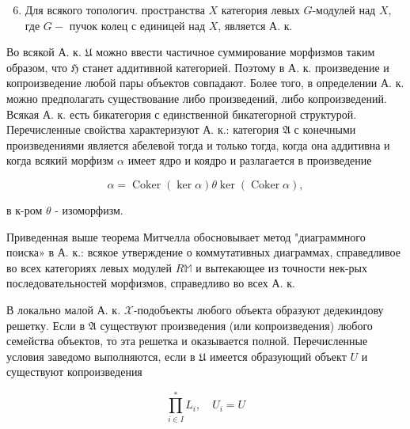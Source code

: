 \documentclass[10pt]{article}
\begin{document}
\begin{enumerate}

  \setcounter{enumi}{5}

  \item Для всякого топологич. пространства $X$ категория левых $G$-модулей над $X$, где $G-$ пучок колец с единицей над $X$, является А. к.

\end{enumerate}



Во всякой А. к. $\mathfrak{U}$ можно ввести частичное суммирование морфизмов таким образом, что $\mathfrak{H}$ станет аддитивной категорией. Поэтому в А. к. произведение и копроизведение любой пары объектов совпадают. Более того, в определении А. к. можно предполагать существование либо произведений, либо копроизведений. Всякая А. к. есть бикатегория с единственной бикатегорной структурой. Перечисленные свойства характеризуют А. к.: категория $\mathfrak{A}$ с конечными произведениями является абелевой тогда и только тогда, когда она аддитивна и когда всякий морфизм $\alpha$ имеет ядро и коядро и разлагается в произведение



\[

\alpha=\operatorname{Coker}(\operatorname{ker} \alpha) \theta \operatorname{ker}(\operatorname{Coker} \alpha),

\]



в к-ром $\theta$ - изоморфизм.



Приведенная выше теорема Митчелла обосновывает метод "диаграммного поиска» в А. к.: всякое утверждение о коммутативных диаграммах, справедливое во всех категориях левых модулей $R \mathbb{M}$ и вытекающее из точности нек-рых последовательностей морфизмов, справедливо во всех А. к.



В локально малой А. к. $\mathfrak{\mathcal { X }}$-подобъекты любого объекта образуют дедекиндову решетку. Если в $\mathfrak{A}$ существуют произведения (или копроизведения) любого семейства объектов, то эта решетка и оказывается полной. Перечисленные условия заведомо выполняются, если в $\mathfrak{U}$ имеется образующий объект $U$ и существуют копроизведения



\[

\prod_{i \in I}^{*} L_{i}, \quad U_{i}=U

\]
\end{document}
